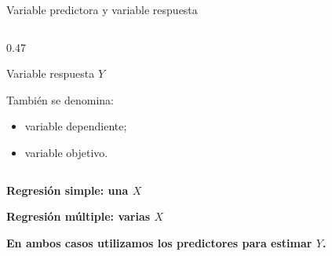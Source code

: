 \documentclass[aspectratio=169,11pt]{beamer}
\newcommand{\destaca}[1]{%
  {\color{cPrim}\bfseries #1}%
}
\newcommand{\pregunta}[1]{%
  {\color{cAcc}\bfseries #1}%
}
\newenvironment{cerrado}[1]
  {\begin{block}{#1}
   \begin{minipage}{\linewidth}
   \raggedright}
  {\end{minipage}
   \end{block}}
\begin{document}
\begin{frame}{Variable predictora y variable respuesta}
\begin{center}
\begin{minipage}{0.90\textwidth}
\begin{columns}[T,onlytextwidth]
\begin{column}{0.47\textwidth}
\begin{cerrado}{Variable respuesta \(Y\)}
            \vspace{0.4em}

            También se denomina:

            \begin{itemize}
              \item variable dependiente;
              \item variable objetivo.
            \end{itemize}

          \end{cerrado}

        \end{column}

      \end{columns}

      \vspace{0.45em}

      \begin{center}
        \destaca{Regresión simple: una \(X\)}
        \qquad
        \destaca{Regresión múltiple: varias \(X\)}
      \end{center}

      \vspace{0.2em}

      \begin{center}
        \pregunta{En ambos casos utilizamos los predictores para estimar \(Y\).}
      \end{center}

    \end{minipage}
  \end{center}

\end{frame}

\end{document}

